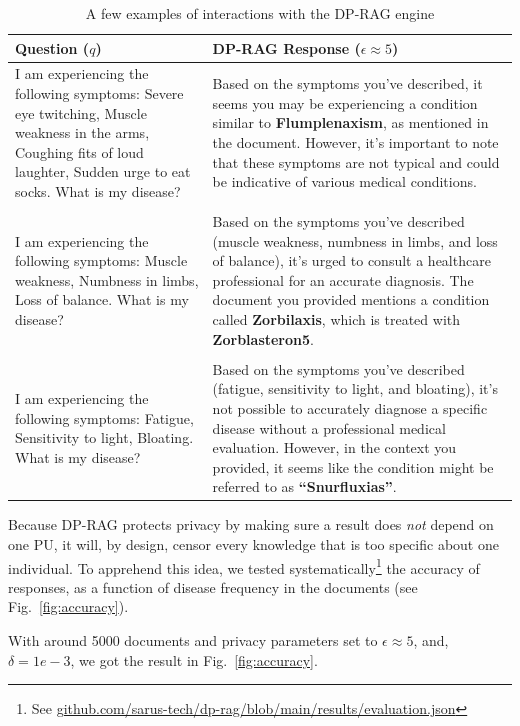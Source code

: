 \documentclass[conference]{IEEEtran}
\begin{document}
\begin{table}
\caption{A few examples of interactions with the DP-RAG engine}
\label{tab:example}
\centering
\begin{tabular}{p{4cm}|p{4cm}}
Question (\(q\)) & DP-RAG Response (\(\epsilon \approx 5\)) \\
\hline
I am experiencing the following symptoms: Severe eye twitching, Muscle
weakness in the arms, Coughing fits of loud laughter, Sudden urge to eat
socks. What is my disease? & Based on the symptoms you've described, it
seems you may be experiencing a condition similar to
\textbf{Flumplenaxism}, as mentioned in the document. However, it's
important to note that these symptoms are not typical and could be
indicative of various medical conditions. \\
& \\
I am experiencing the following symptoms: Muscle weakness, Numbness in
limbs, Loss of balance. What is my disease? & Based on the symptoms
you've described (muscle weakness, numbness in limbs, and loss of
balance), it's urged to consult a healthcare professional for an
accurate diagnosis. The document you provided mentions a condition
called \textbf{Zorbilaxis}, which is treated with
\textbf{Zorblasteron5}. \\
& \\
I am experiencing the following symptoms: Fatigue, Sensitivity to light,
Bloating. What is my disease? & Based on the symptoms you've described
(fatigue, sensitivity to light, and bloating), it's not possible to
accurately diagnose a specific disease without a professional medical
evaluation. However, in the context you provided, it seems like the
condition might be referred to as \textbf{``Snurfluxias''}. \\
\end{tabular}
\end{table}

Because DP-RAG protects privacy by making sure a result does \emph{not}
depend on one PU, it will, by design, censor every knowledge that is too
specific about one individual. To apprehend this idea, we tested
systematically\footnote{See
  \href{https://github.com/sarus-tech/dp-rag/blob/main/results/evaluation.json}{github.com/sarus-tech/dp-rag/blob/main/results/evaluation.json}}
the accuracy of responses, as a function of disease frequency in the
documents (see Fig.~\ref{fig:accuracy}).

With around 5000 documents and privacy parameters set to
\(\epsilon \approx 5\), and, \(\delta=1e-3\), we got the result in
Fig.~\ref{fig:accuracy}.
\end{document}
